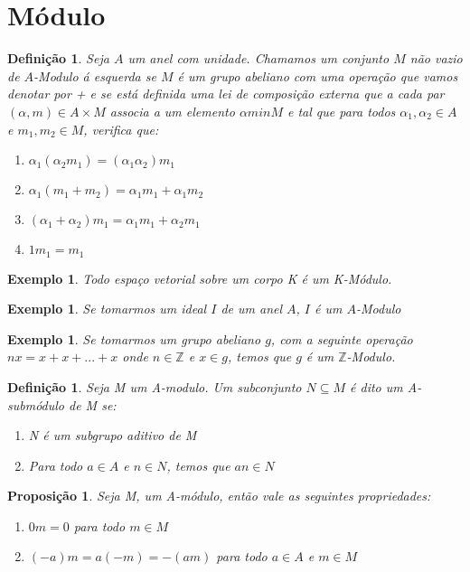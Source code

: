 \documentclass[10pt,a4paper]{article}
\newtheorem{proposition}[theorem]{Proposição}
\newtheorem{example}[theorem]{Exemplo}
\newtheorem{definition}[theorem]{Definição}
\begin{document}
\section{Módulo}

\begin{definition}
	Seja $A$ um anel com unidade. Chamamos um conjunto $M$ não vazio de $A$-Modulo á esquerda se $M$ é um grupo abeliano com uma operação que vamos denotar por + e se está definida uma lei de composição externa que a cada par $(\alpha, m) \in A\times M$ associa a um elemento $\alpha m in M$ e tal que para todos $\alpha_1, \alpha_2 \in A$ e $m_1, m_2 \in M$, verifica que: 
	\begin{enumerate}
		\item $\alpha_1(\alpha_2 m_1) = (\alpha_1 \alpha_2)m_1$
		\item $\alpha_1(m_1+m_2) = \alpha_1 m_1 + \alpha_1 m_2$
		\item $(\alpha_1+\alpha_2)m_1=\alpha_1 m_1+\alpha_2 m_1$
		\item $1m_1=m_1$
	\end{enumerate}
\end{definition}

\begin{example}
	Todo espaço vetorial sobre um corpo K é um K-Módulo.
\end{example}

\begin{example}
	Se tomarmos um ideal $I$ de um anel $A$, $I$ é um $A$-Modulo
\end{example}

\begin{example}
	Se tomarmos um grupo abeliano $g$, com a seguinte operação $nx = x+x+...+x$ onde $n \in \mathbb{Z}$ e $x \in g$, temos que $g$ é um $\mathbb{Z}$-Modulo.
\end{example}

\begin{definition}
	Seja M um A-modulo. Um subconjunto $N \subseteq M$ é dito um A-submódulo de M se:
	\begin{enumerate}
		\item N é um subgrupo aditivo de M
		\item Para todo $a \in A$ e $n \in N$, temos que $an \in N$
	\end{enumerate}
\end{definition}

\begin{proposition}
	Seja M, um A-módulo, então vale as seguintes propriedades:
	\begin{enumerate}
		\item $0m=0$ para todo $m \in M$
		\item $(-a)m=a(-m)=-(am)$ para todo $a \in A$ e $m \in M$
	\end{enumerate}
\end{proposition}
\end{document}
